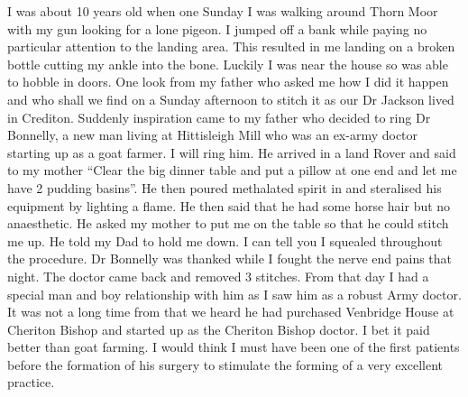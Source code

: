 
I was about 10 years old when one Sunday I was walking around Thorn Moor with my
gun looking for a lone pigeon. I jumped off a bank while paying no particular
attention to the landing area. This resulted in me landing on a broken bottle
cutting my ankle into the bone. Luckily I was near the house so was able to
hobble in doors. One look from my father who asked me how I did it happen and
who shall we find on a Sunday afternoon to stitch it as our Dr Jackson lived in
Crediton. Suddenly inspiration came to my father who decided to ring Dr
Bonnelly, a new man living at Hittisleigh Mill who was an ex-army doctor
starting up as a goat farmer. I will ring him. He arrived in a land Rover and
said to my mother ``Clear the big dinner table and put a pillow at one end and
let me have 2 pudding basins''. He then poured methalated spirit in and
steralised his equipment by lighting a flame. He then said that he had some
horse hair but no anaesthetic. He asked my mother to put me on the table so
that he could stitch me up. He told my Dad to hold me down. I can tell you I
squealed throughout the procedure. Dr Bonnelly was thanked while I fought the
nerve end pains that night. The doctor came back and removed 3 stitches. From
that day I had a special man and boy relationship with him as I saw him as a
robust Army doctor. It was not a long time from that we heard he had purchased
Venbridge House at Cheriton Bishop and started up as the Cheriton Bishop
doctor. I bet it paid better than goat farming. I would think I must have been
one of the first patients before the formation of his surgery to stimulate the
forming of a very excellent practice.

